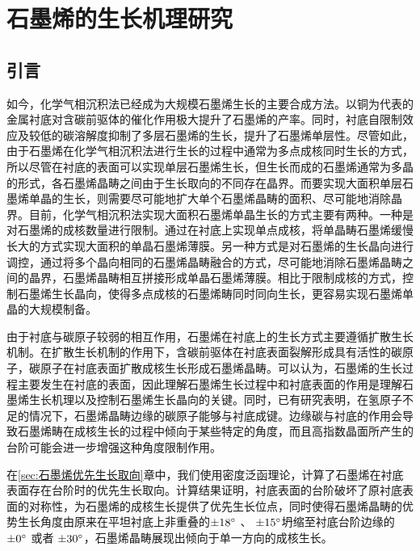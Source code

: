 \def\CCluster#1{\rm{C_{#1}}}
\chapter{石墨烯的生长机理研究}
\label{cap:石墨烯的生长机理研究}
\section{引言}
如今，化学气相沉积法已经成为大规模石墨烯生长的主要合成方法。以铜为代表的金属衬底对含碳前驱体的催化作用极大提升了石墨烯的产率。同时，衬底自限制效应及较低的碳溶解度抑制了多层石墨烯的生长，提升了石墨烯单层性。尽管如此，由于石墨烯在化学气相沉积法进行生长的过程中通常为多点成核同时生长的方式，所以尽管在衬底的表面可以实现单层石墨烯生长，但生长而成的石墨烯通常为多晶的形式，各石墨烯晶畴之间由于生长取向的不同存在晶界。而要实现大面积单层石墨烯单晶的生长，则需要尽可能地扩大单个石墨烯晶畴的面积、尽可能地消除晶界。目前，化学气相沉积法实现大面积石墨烯单晶生长的方式主要有两种。一种是对石墨烯的成核数量进行限制。通过在衬底上实现单点成核，将单晶畴石墨烯缓慢长大的方式实现大面积的单晶石墨烯薄膜。另一种方式是对石墨烯的生长晶向进行调控，通过将多个晶向相同的石墨烯晶畴融合的方式，尽可能地消除石墨烯晶畴之间的晶界，石墨烯晶畴相互拼接形成单晶石墨烯薄膜。相比于限制成核的方式，控制石墨烯生长晶向，使得多点成核的石墨烯畴同时同向生长，更容易实现石墨烯单晶的大规模制备。

由于衬底与碳原子较弱的相互作用，石墨烯在衬底上的生长方式主要遵循扩散生长机制。在扩散生长机制的作用下，含碳前驱体在衬底表面裂解形成具有活性的碳原子，碳原子在衬底表面扩散成核生长形成石墨烯晶畴。可以认为，石墨烯的生长过程主要发生在衬底的表面，因此理解石墨烯生长过程中和衬底表面的作用是理解石墨烯生长机理以及控制石墨烯生长晶向的关键。同时，已有研究表明，在氢原子不足的情况下，石墨烯晶畴边缘的碳原子能够与衬底成键。边缘碳与衬底的作用会导致石墨烯畴在成核生长的过程中倾向于某些特定的角度，而且高指数晶面所产生的台阶可能会进一步增强这种角度限制作用。

在\ref{sec:石墨烯优先生长取向}章中，我们使用密度泛函理论，计算了石墨烯在衬底表面存在台阶时的优先生长取向。计算结果证明，衬底表面的台阶破坏了原衬底表面的对称性，为石墨烯的成核生长提供了优先生长位点，同时使得石墨烯晶畴的优势生长角度由原来在平坦衬底上非重叠的$\SI{\pm 18}{\degree}$ 、 $\SI{\pm 15}{\degree}$坍缩至衬底台阶边缘的$\SI{\pm 0}{\degree}$ 或者 $\SI{\pm 30}{\degree}$，石墨烯晶畴展现出倾向于单一方向的成核生长。

